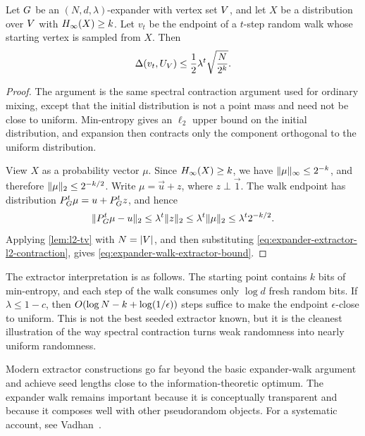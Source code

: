 \begin{theorem}
	\label{thm:expander-extractor}
	Let \(G\) be an \((N,d,\lambda)\)-expander with vertex set \(V\), and let \(X\) be a distribution over \(V\) with \(H_\infty(X)\geq k\). Let \(v_t\) be the endpoint of a \(t\)-step random walk whose starting vertex is sampled from \(X\). Then
	\begin{equation}
		\label{eq:expander-walk-extractor-bound}
		\Delta(v_t,U_{V})\leq \frac{1}{2}\lambda^t\sqrt{\frac{N}{2^k}}.
	\end{equation}
\end{theorem}

\begin{proof}
	The argument is the same spectral contraction argument used for ordinary mixing, except that the initial distribution is not a point mass and need not be close to uniform. Min-entropy gives an \(\ell_2\) upper bound on the initial distribution, and expansion then contracts only the component orthogonal to the uniform distribution.

	View \(X\) as a probability vector \(\mu\). Since \(H_\infty(X)\geq k\), we have \(\lVert\mu\rVert_\infty\leq 2^{-k}\), and therefore \(\lVert\mu\rVert_2\leq 2^{-k/2}\). Write \(\mu=\vec{u}+z\), where \(z\perp\vec{1}\). The walk endpoint has distribution \(P_{G}^t\mu=u+P_{G}^t z\), and hence
	\begin{equation}
		\label{eq:expander-extractor-l2-contraction}
		\lVert P_{G}^t\mu-u\rVert_2\leq \lambda^t\lVert z\rVert_2\leq \lambda^t\lVert\mu\rVert_2\leq \lambda^t2^{-k/2}.
	\end{equation}
	Applying \cref{lem:l2-tv} with \(N=\lvert V\rvert\), and then substituting \cref{eq:expander-extractor-l2-contraction}, gives \cref{eq:expander-walk-extractor-bound}.
\end{proof}

The extractor interpretation is as follows. The starting point contains \(k\) bits of min-entropy, and each step of the walk consumes only \(\log d\) fresh random bits. If \(\lambda\leq 1-c\), then \(\bigO(\log N-k+\log(1/\epsilon))\) steps suffice to make the endpoint \(\epsilon\)-close to uniform. This is not the best seeded extractor known, but it is the cleanest illustration of the way spectral contraction turns weak randomness into nearly uniform randomness.

\begin{remark}
	Modern extractor constructions go far beyond the basic expander-walk argument and achieve seed lengths close to the information-theoretic optimum. The expander walk remains important because it is conceptually transparent and because it composes well with other pseudorandom objects. For a systematic account, see Vadhan~\cite{Vad2012}.
\end{remark}

